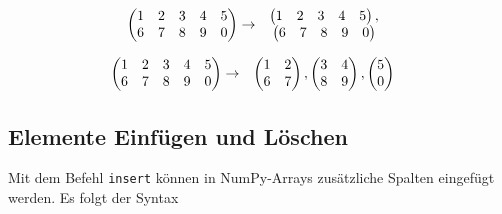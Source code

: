 \begin{tcbraster}[raster columns=2,
                  raster equal height,
                  nobeforeafter,
                  raster column skip=0.15cm]
\begin{tcolorbox}[title=\texttt{np.split(data, 2)}]
\begin{align*}
	\begin{pmatrix}
		1 & 2 & 3 & 4 & 5\\
		6 & 7 & 8 & 9 & 0
	\end{pmatrix}
&\rightarrow&&
	\begin{matrix}
	\begin{pmatrix}
		1 & 2 & 3 & 4 & 5
	\end{pmatrix},
	\\
	\begin{pmatrix}
		6 & 7 & 8 & 9 & 0
	\end{pmatrix}
	\end{matrix}
\end{align*}
\end{tcolorbox}
%
\begin{tcolorbox}[title=\texttt{np.split(data, (2, 4), axis=1)}]
\begin{align*}
	\begin{pmatrix}
		1 & 2 & 3 & 4 & 5\\
		6 & 7 & 8 & 9 & 0
	\end{pmatrix}
&\rightarrow&&
	\begin{matrix}
	\begin{pmatrix}
		1 & 2 \\ 6 & 7
	\end{pmatrix},
	\begin{pmatrix}
		3 & 4 \\ 8 & 9
	\end{pmatrix},
	\begin{pmatrix}
		5 \\ 0
	\end{pmatrix}
	\end{matrix}
\end{align*}
\end{tcolorbox}
\end{tcbraster}

\subsection{Elemente Einfügen und Löschen}
Mit dem Befehl \texttt{insert} können in NumPy-Arrays zusätzliche Spalten eingefügt werden. Es folgt der Syntax
\begin{center}
\end{center}

